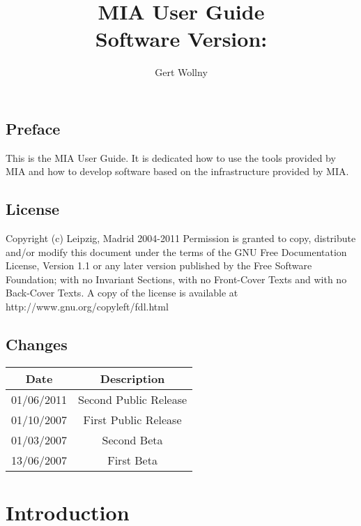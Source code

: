 \documentclass[english, 10pt, a4paper,headsepline,openany]{scrbook}
\begin{document}
\vfill{}
\title{MIA User Guide \\Software Version: \miaversion}
\vfill{}


\author{Gert Wollny}

\maketitle

\section*{Preface}

This is the MIA User Guide. 
It is dedicated how to use the tools provided by MIA and how to develop software based on the infrastructure provided by MIA.


\section*{License}

Copyright (c) Leipzig, Madrid 2004-2011
Permission is granted to copy, distribute and/or modify this document under the terms of the GNU Free Documentation License, Version 1.1
  or any later version published by the Free Software Foundation; with no Invariant Sections, 
  with no Front-Cover Texts and with no Back-Cover Texts. 
A copy of the license is available at http://www.gnu.org/copyleft/fdl.html

\section*{Changes}

\begin{center}
\begin{tabular}{|c|c|}
\hline 
Date  & Description\\
\hline
\hline 
01/06/2011 & Second Public Release  \\
01/10/2007 & First Public Release  \\
01/03/2007 & Second Beta \\
13/06/2007 & First Beta  \\
\hline
\end{tabular}
\end{center}

\tableofcontents{}

\pagestyle{headings}


\chapter{Introduction}
\end{document}
